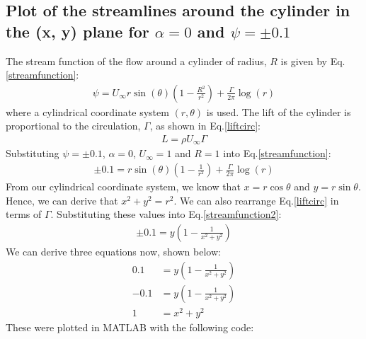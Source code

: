 \documentclass[11pt]{article}
\begin{document}
\subsection*{Plot of the streamlines around the cylinder in the (x, y) plane for $\alpha = 0$ and $\psi = \pm 0.1$}
The stream function of the flow around a cylinder of radius, $R$ is given by Eq.\ref{streamfunction}:
\begin{align}
  \psi = U_{\infty}r\sin\left(\theta\right) \left(1 - \frac{R^2}{r^2}\right) + \frac{\Gamma}{2\pi}\log\left(r\right)\label{streamfunction}
\end{align}
where a cylindrical coordinate system $(r,\theta)$ is used. 
The lift of the cylinder is proportional to the circulation, $\Gamma$, as shown in Eq.\ref{liftcirc}:
\begin{align}
  L = \rho U_{\infty} \Gamma \label{liftcirc}
\end{align}  
Substituting $\psi = \pm 0.1$, $\alpha = 0$, $U_{\infty} = 1$ and $R=1$ into Eq.\ref{streamfunction}:
\begin{align}
  \pm 0.1 = r\sin\left(\theta\right) \left(1-\frac{1}{r^2}\right) + \frac{\Gamma}{2\pi} \log\left(r\right) \label{streamfunction2}
\end{align}
From our cylindrical coordinate system, we know that $x=r\cos\theta$ and $y = r\sin\theta$. Hence, we can derive that $x^2 + y^2 = r^2$. We can also rearrange Eq.\ref{liftcirc} in terms of $\Gamma$. Substituting these values into Eq.\ref{streamfunction2}:
\begin{align}
  \pm 0.1 = y\left(1-\frac{1}{x^2 + y^2}\right)\label{streamfunction3}
\end{align}
We can derive three equations now, shown below:
\begin{align}
  0.1 &= y\left(1-\frac{1}{x^2 + y^2}\right)\\
  -0.1 &= y\left(1-\frac{1}{x^2 + y^2}\right)\\
  1 &= x^2 + y^2
\end{align}
These were plotted in MATLAB with the following code:
\end{document}
